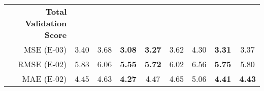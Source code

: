 \begin{table}[htbp]
\begin{tabular}{r|cccccccc}
        \textbf{Total Validation Score         } &       &       &       &       &       &       &       &  \\
        MSE (E-03)   & 3.40  & 3.68  & \textbf{3.08} & \textbf{3.27} & 3.62  & 4.30  & \textbf{3.31} & 3.37 \\
        RMSE (E-02)   & 5.83  & 6.06  & \textbf{5.55} & \textbf{5.72} & 6.02  & 6.56  & \textbf{5.75} & 5.80 \\
        MAE (E-02)   & 4.45  & 4.63  & \textbf{4.27} & 4.47  & 4.65  & 5.06  & \textbf{4.41} & \textbf{4.43} \\
    \end{tabular}%
  \label{table6}%
\end{table}%



